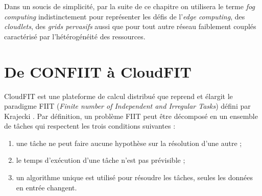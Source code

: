 Dans un soucis de simplicité, par la suite de ce chapitre on utilisera le terme \textit{fog computing} indistinctement pour représenter les défis de l'\textit{edge computing}, des \textit{cloudlets}, des \textit{grids pervasifs} aussi que pour tout autre réseau faiblement couplés caractérisé par l'hétérogénéité des ressources.
 


\section{De CONFIIT à CloudFIT}

CloudFIT est une plateforme de calcul distribué que reprend et élargit le paradigme FIIT (\textit{Finite number of Independent and Irregular Tasks}) défini par Krajecki \cite{Kraj99}. Par définition, un problème FIIT peut être décomposé en un ensemble de tâches qui respectent les trois conditions suivantes :
\begin{enumerate}
	\item une tâche ne peut faire aucune hypothèse sur la résolution d'une autre ;
	\item le temps d'exécution d'une tâche n'est pas prévisible ;
	\item un algorithme unique est utilisé pour résoudre les tâches, seules les données en entrée changent. 
\end{enumerate}

